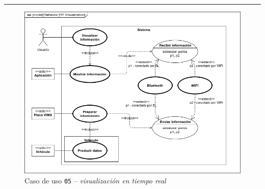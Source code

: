 \noindent\rule{\linewidth}{.2pt}

\begin{figure}[H]
  \centering
  \includegraphics[width=\linewidth]{diagrams/UseCases-UC5 - visualization.png}
  \caption{Caso de uso \texttt{05} -- \textit{visualización en tiempo real}}
  \label{uc:visualization}
\end{figure}


